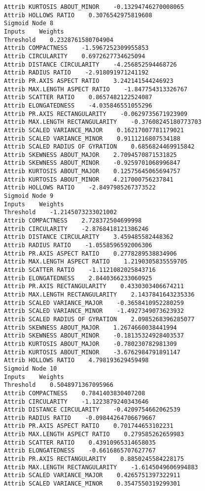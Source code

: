 \documentclass[
	article,			%
	11pt,				%
	oneside,			%
	a4paper,			%
	english,			%
	brazil,				%
	sumario=tradicional
	]{abntex2}
\begin{document}
\begin{lstlisting}
Attrib KURTOSIS ABOUT_MINOR    -0.13294746270008065
Attrib HOLLOWS RATIO    0.3076542975819608
Sigmoid Node 8
Inputs    Weights
Threshold    0.2328761580704904
Attrib COMPACTNESS    -1.5967252309955853
Attrib CIRCULARITY    0.6972627734625094
Attrib DISTANCE CIRCULARITY    -4.256852594468726
Attrib RADIUS RATIO    -2.918091971241192
Attrib PR.AXIS ASPECT RATIO    3.242141544246923
Attrib MAX.LENGTH ASPECT RATIO    -1.847754313326767
Attrib SCATTER RATIO    0.8657482122524087
Attrib ELONGATEDNESS    -4.035846551055296
Attrib PR.AXIS RECTANGULARITY    -0.0629735671923909
Attrib MAX.LENGTH RECTANGULARITY    -0.37608245180773703
Attrib SCALED VARIANCE_MAJOR    0.16217007781179021
Attrib SCALED VARIANCE_MINOR    0.9111216807534188
Attrib SCALED RADIUS OF GYRATION    0.6856824469915842
Attrib SKEWNESS ABOUT_MAJOR    2.7094570871531825
Attrib SKEWNESS ABOUT_MINOR    -0.9259701068996847
Attrib KURTOSIS ABOUT_MAJOR    0.12575645065694757
Attrib KURTOSIS ABOUT_MINOR    4.217000756237841
Attrib HOLLOWS RATIO    -2.8497985267373522
Sigmoid Node 9
Inputs    Weights
Threshold    -1.2145073233021002
Attrib COMPACTNESS    2.728372504699998
Attrib CIRCULARITY    -2.8768418121386246
Attrib DISTANCE CIRCULARITY    3.459485582448362
Attrib RADIUS RATIO    -1.0558596592006306
Attrib PR.AXIS ASPECT RATIO    0.2778289538834906
Attrib MAX.LENGTH ASPECT RATIO    1.2190305835559705
Attrib SCATTER RATIO    -1.1121082025843716
Attrib ELONGATEDNESS    2.8440366233060925
Attrib PR.AXIS RECTANGULARITY    0.4330303406674211
Attrib MAX.LENGTH RECTANGULARITY    2.1437841643235336
Attrib SCALED VARIANCE_MAJOR    -0.3658410952280259
Attrib SCALED VARIANCE_MINOR    -1.4927349073623932
Attrib SCALED RADIUS OF GYRATION    2.0985268396285077
Attrib SKEWNESS ABOUT_MAJOR    1.2674660038441994
Attrib SKEWNESS ABOUT_MINOR    -0.18135324928403537
Attrib KURTOSIS ABOUT_MAJOR    -0.780230782981309
Attrib KURTOSIS ABOUT_MINOR    -3.6762984791891147
Attrib HOLLOWS RATIO    4.798193629459498
Sigmoid Node 10
Inputs    Weights
Threshold    0.5048971367095966
Attrib COMPACTNESS    0.7841403830407208
Attrib CIRCULARITY    -1.1223879240343646
Attrib DISTANCE CIRCULARITY    -0.4209754662062539
Attrib RADIUS RATIO    -0.09844264706679667
Attrib PR.AXIS ASPECT RATIO    0.701744653102231
Attrib MAX.LENGTH ASPECT RATIO    0.279585262659983
Attrib SCATTER RATIO    0.43910965314658035
Attrib ELONGATEDNESS    -0.6616865707627767
Attrib PR.AXIS RECTANGULARITY    0.8850245584228175
Attrib MAX.LENGTH RECTANGULARITY    -1.6145049606994883
Attrib SCALED VARIANCE_MAJOR    0.4265751397322911
Attrib SCALED VARIANCE_MINOR    0.3547550319299301

\end{lstlisting}
\end{document}
